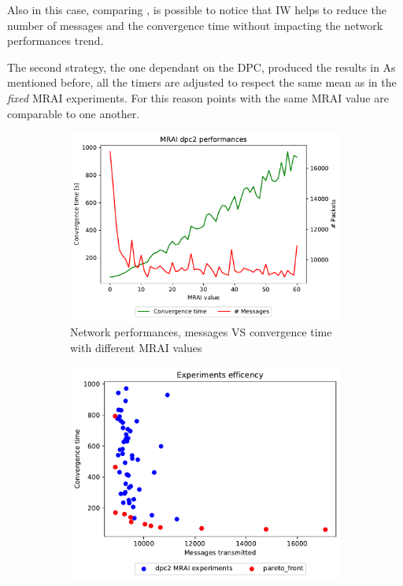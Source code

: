 Also in this case, comparing ,
is possible to notice that \ac{IW}
helps to reduce the number of messages and the convergence time without impacting
the network performances trend.

The second strategy, the one dependant on the \ac{DPC}, produced the results
in 
As mentioned before, all the timers are adjusted to respect the same mean as in 
the \textit{fixed} \ac{MRAI} experiments.
For this reason points with the same \ac{MRAI} value are comparable to one another.

\begin{figure}[h]
     \centering
     \begin{subfigure}[b]{0.45\textwidth}
         \centering
         \includegraphics[width=\textwidth]{images/internet_like/1000/dpc/internet_like-DPC_mrai_evolution.pdf}
		 \caption{Network performances, messages VS convergence time with different
			\ac{MRAI} values}
         \label{fig:internt_like_1000_DPC_evolution_evolution}
     \end{subfigure}
     \hfill
     \begin{subfigure}[b]{0.45\textwidth}
         \centering
         \includegraphics[width=\textwidth]{images/internet_like/1000/dpc/internet_like-DPC.pdf}

\end{subfigure}
\end{figure}
